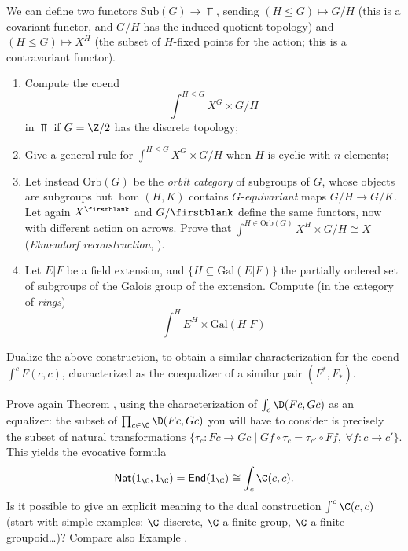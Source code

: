 \begin{exerciseset}
\begin{exercisepoints}
We can define two functors $\text{Sub}(G) \to \Top$, sending $(H\le G) \mapsto G/H$ (this is a covariant functor, and $G/H$ has the induced quotient topology) and $(H\le G)\mapsto X^H$ (the subset of $H$-fixed points for the action; this is a contravariant functor).
\begin{enumerate}
\item Compute the coend 
\[
\int^{H\le G} X^G \times G/H
\] 
in $\Top$ if $G = \Z/2$ has the discrete topology;
\item Give a general rule for $\int^{H\le G} X^G \times G/H$ when $H$ is cyclic with $n$ elements;
\item Let instead $\text{Orb}(G)$ be the \emph{orbit category} of subgroups of $G$, whose objects are subgroups but $\hom(H,K)$ contains $G$-\emph{equivariant} maps $G/H \to G/K$. Let again $X^{\firstblank}$ and $G/\firstblank$ define the same functors, now with different action on arrows. Prove that $\int^{H\in\text{Orb}(G)} X^H \times G/H \cong X$ (\emph{Elmendorf reconstruction}, \cite{Elmendorf1983}).
\item Let $E|F$ be a field extension, and $\{H \subseteq \text{Gal}(E|F)\}$ the partially ordered set of subgroups of the Galois group of the extension. Compute (in the category of \emph{rings})
\[
\int^{H} E^H \times \text{Gal}(H|F)
\]
\end{enumerate}
\item \label{ex1:iscoeq} Dualize the above construction, to obtain a similar characterization for the coend $\int^c F(c,c)$, characterized as the coequalizer of a similar pair $(F^*, F_*)$.
\item \label{ex1:niftynat} Prove again Theorem , using the characterization of $\int_c\D(Fc,Gc)$ as an equalizer: the subset of $\prod_{c\in\C} \D(Fc,Gc)$ you will have to consider is precisely the subset of natural transformations $\{\tau_c\colon Fc\to Gc\mid Gf\circ \tau_c = \tau_{c'}\circ Ff,\;\forall f\colon c\to c'\}$.
This yields the evocative formula
\[
\textsf{Nat}(1_\C, 1_\C) = \textsf{End}(1_\C) \cong \int_c \C(c,c).
\]
Is it possible to give an explicit meaning to the dual construction $\int^c \C(c,c)$ (start with simple examples: $\C$ discrete, $\C$ a finite group, $\C$ a finite groupoid\dots)? Compare also Example .

\end{exercisepoints}
\end{exerciseset}
